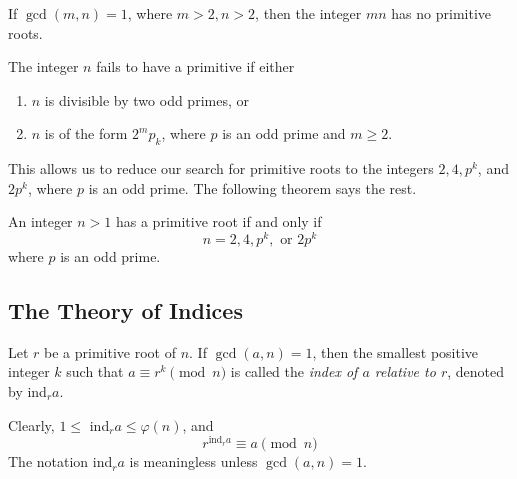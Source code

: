\documentclass{article}
\newcounter{theorem}[section]
\newcounter{definition}[section]
\begin{document}
\begin{theorem}
  \label{thm:coprime-products-have-no-primitive-roots}
If $\gcd(m, n) = 1$, where $m>2, n>2$, then the integer $mn$ has no primitive roots. 
\end{theorem}

\begin{corollary}
  \label{thm:obstructions-to-having-a-primitive-root}
The integer $n$ fails to have a primitive if either
\begin{enumerate}
    \item $n$ is divisible by two odd primes, or
    \item $n$ is of the form $2^m p_k$, where $p$ is an odd prime and $m\geq 2$. 
\end{enumerate}
\end{corollary}

This allows us to reduce our search for primitive roots to the integers $2, 4, p^k$, and $2p^k$, where $p$ is an odd prime. The following theorem says the rest. 

\begin{theorem}
  \label{thm:classification-of-integers-with-primitive-roots}
An integer $n>1$ has a primitive root if and only if 
\begin{equation}
  n = 2, 4, p^k, \text{ or } 2p^k
\end{equation}
where $p$ is an odd prime. 
\end{theorem}

\subsection{The Theory of Indices}

\begin{definition}
  \label{def:index-of-a-relative-to-r}
Let $r$ be a primitive root of $n$. If $\gcd(a, n) = 1$, then the smallest positive integer $k$ such that $a \equiv r^k \pmod{n}$ is called the \textit{index of $a$ relative to $r$}, denoted by ind$_r a$. 
\end{definition}

Clearly, $1 \leq$ ind$_r a \leq \varphi(n)$, and 
\begin{equation}
  r^{\text{ind}_r a} \equiv a \pmod{n}
\end{equation}
The notation ind$_r a$ is meaningless unless $\gcd(a, n) = 1$. 
\end{document}
